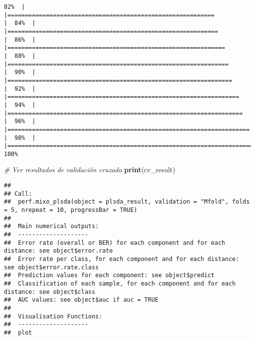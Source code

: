 \documentclass[
]{article}
\newenvironment{Shaded}{\begin{snugshade}}{\end{snugshade}}
\newcommand{\CommentTok}[1]{\textcolor[rgb]{0.56,0.35,0.01}{\textit{#1}}}
\newcommand{\FunctionTok}[1]{\textcolor[rgb]{0.13,0.29,0.53}{\textbf{#1}}}
\newcommand{\NormalTok}[1]{#1}
\begin{document}
\begin{verbatim}
82%  |                                                                              |===========================================================           |  84%  |                                                                              |============================================================          |  86%  |                                                                              |==============================================================        |  88%  |                                                                              |===============================================================       |  90%  |                                                                              |================================================================      |  92%  |                                                                              |==================================================================    |  94%  |                                                                              |===================================================================   |  96%  |                                                                              |===================================================================== |  98%  |                                                                              |======================================================================| 100%
\end{verbatim}

\begin{Shaded}
\begin{Highlighting}[]
\CommentTok{\# Ver resultados de validación cruzada}
\FunctionTok{print}\NormalTok{(cv\_result)}
\end{Highlighting}
\end{Shaded}

\begin{verbatim}
## 
## Call:
##  perf.mixo_plsda(object = plsda_result, validation = "Mfold", folds = 5, nrepeat = 10, progressBar = TRUE) 
## 
##  Main numerical outputs: 
##  -------------------- 
##  Error rate (overall or BER) for each component and for each distance: see object$error.rate 
##  Error rate per class, for each component and for each distance: see object$error.rate.class 
##  Prediction values for each component: see object$predict 
##  Classification of each sample, for each component and for each distance: see object$class 
##  AUC values: see object$auc if auc = TRUE 
## 
##  Visualisation Functions: 
##  -------------------- 
##  plot
\end{verbatim}
\end{document}
